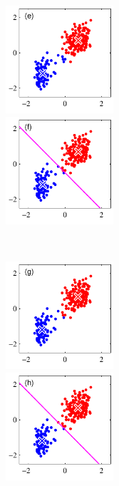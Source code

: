\begin{figure}[htbp]
\begin{minipage}{0.33\hsize}
\begin{center}
    \end{center}
  \end{minipage}
  \begin{minipage}{0.33\hsize}
    \begin{center}
      \includegraphics[width=40mm]{img/kmeans/Figure91e.pdf}
    \end{center}
  \end{minipage}
  \begin{minipage}{0.33\hsize}
    \begin{center}
      \includegraphics[width=40mm]{img/kmeans/Figure91f.pdf}
    \end{center}
  \end{minipage}\\
  \begin{minipage}{0.33\hsize}
    \begin{center}
      \includegraphics[width=40mm]{img/kmeans/Figure91g.pdf}
    \end{center}
  \end{minipage}
  \begin{minipage}{0.33\hsize}
    \begin{center}
      \includegraphics[width=40mm]{img/kmeans/Figure91h.pdf}

\end{center}
\end{minipage}
\end{figure}

